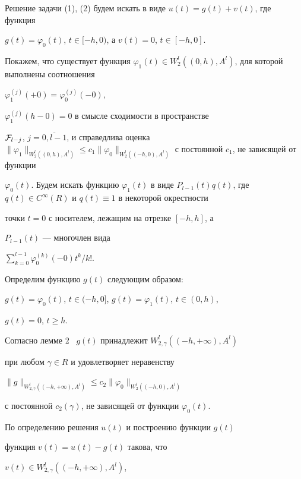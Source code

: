 Решение задачи (1), (2) будем искать в виде $u(t)=g(t)+v(t)$, где функция


$g(t)=\varphi_0(t)$, $t\in [-h,0)$, а $v(t)=0$, $t\in [-h,0]$.





Покажем, что существует функция $\varphi_1(t)\in


W^l_2((0,h),A^l)$, для которой выполнены соотношения


$\varphi^{(j)}_1(+0)=\varphi^{(j)}_0(-0)$,


$\varphi^{(j)}_1(h-0)=0$ в смысле сходимости в пространстве


${\pF}_{l-j}$, $j=\overline{0,l-1}$, и справедлива оценка $ \|


\varphi_1\|_{W^l_2((0,h),A^l)}\leq c_1\| \varphi_0\|


_{W^l_2((-h,0),A^l)}$ с постоянной $c_1$, не зависящей от функции


$\varphi_0(t)$. Будем искать функцию $\varphi


_1(t)$ в виде $P_{l-1}(t)q(t)$, где $q(t)\in


C^{\infty }(R)$ и $q(t)\equiv1$ в некоторой окрестности


точки $t=0$ с носителем, лежащим на отрезке $[-h,h]$, а


$P_{l-1}(t)$ --- многочлен вида


$\sum\limits_{k=0}^{l-1}\varphi^{(k)}_0(-0)t^k/k!$.





Определим функцию $g(t)$ следующим образом:


$g(t)=\varphi_0(t)$, $t\in (-h,0]$, $g(t)=\varphi_1(t)$, $ t\in (0,h)$,


$g(t)=0$, $t\geq h$.


Согласно лемме 2 \ $g(t)$ принадлежит $W^l_{2,\gamma }((-h,+\infty ),A^l)$


при любом $\gamma \in R$ и удовлетворяет неравенству


$\| g\|_{W^l_{2,\gamma }((-h,+\infty ),A^l)}\leq


c_2\| \varphi_0\|_{W^l_2((-h,0),A^l)}$


с постоянной $c_2(\gamma )$, не зависящей от функции $\varphi_0(t)$.


По определению решения $u(t)$ и построению функции $g(t)$


функция $v(t)=u(t)-g(t)$ такова, что


$v(t)\in W^l_{2,\gamma }((-h, +\infty ),A^l)$,


